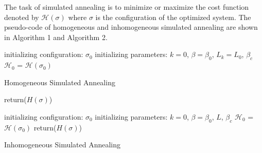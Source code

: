 \documentclass{turabian-researchpaper}
\begin{document}
        The task of simulated annealing is to minimize or maximize the cost function denoted by $\mathcal{H} (\sigma)$ where $\sigma$ is the configuration of the optimized system. The pseudo-code of homogeneous and inhomogeneous simulated annealing are shown in Algorithm 1 and Algorithm 2\cite{chibante2010simulated}. 

            \begin{algorithm}
                initializing configuration: $\sigma_0$\;
                initializing parameters: $k = 0$, $\beta = \beta_0$, $L_k = L_0$, $\beta_c$\;
                $\mathcal{H} _0$ = $\mathcal{H} (\sigma_0)$\;
                \caption{Homogeneous Simulated Annealing\cite{chibante2010simulated}}
                return($H(\sigma)$)
            \end{algorithm}
            
            \begin{algorithm}
                initializing configuration: $\sigma_0$\;
                initializing parameters: $k = 0$, $\beta = \beta_0$, $L$, $\beta_c$\;
                $\mathcal{H} _0$ = $\mathcal{H} (\sigma_0)$\;
                return($H(\sigma)$)

                \caption{Inhomogeneous Simulated Annealing\cite{chibante2010simulated}}
            \end{algorithm}
\end{document}
